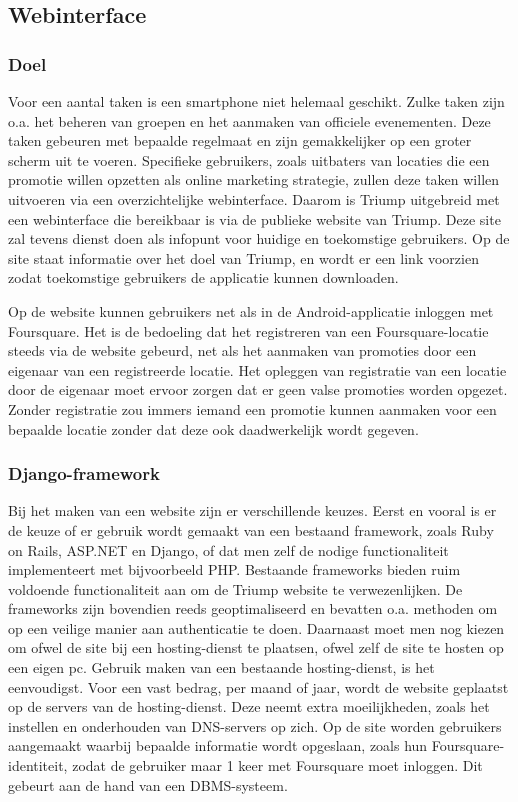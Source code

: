 \subsection{Webinterface}
\label{Webinterface}
\subsubsection{Doel}
Voor een aantal taken is een smartphone niet helemaal geschikt. Zulke taken zijn o.a. het beheren van groepen en het aanmaken van officiele evenementen.
Deze taken gebeuren met bepaalde regelmaat en zijn gemakkelijker op een groter scherm uit te voeren. Specifieke gebruikers, zoals uitbaters van locaties die een promotie willen opzetten als online marketing strategie, zullen deze taken willen uitvoeren via een overzichtelijke webinterface. Daarom is Triump uitgebreid met een webinterface die bereikbaar is via de publieke website van Triump.
Deze site zal tevens dienst doen als infopunt voor huidige en toekomstige gebruikers. Op de site staat informatie over het doel van Triump, en wordt er een link voorzien zodat toekomstige gebruikers de applicatie kunnen downloaden.

Op de website kunnen gebruikers net als in de Android-applicatie inloggen met Foursquare. Het is de bedoeling dat het registreren van een Foursquare-locatie steeds via de website gebeurd, net als het aanmaken van promoties door een eigenaar van een registreerde locatie. Het opleggen van registratie van een locatie door de eigenaar moet ervoor zorgen dat er geen valse promoties worden opgezet. Zonder registratie zou immers iemand een promotie kunnen aanmaken voor een bepaalde locatie zonder dat deze ook daadwerkelijk wordt gegeven.

\subsubsection{Django-framework}
Bij het maken van een website zijn er verschillende keuzes.
Eerst en vooral is er de keuze of er gebruik wordt gemaakt van een bestaand framework, zoals Ruby on Rails, ASP.NET en Django, of dat men zelf de nodige functionaliteit implementeert met bijvoorbeeld PHP.
Bestaande frameworks bieden ruim voldoende functionaliteit aan om de Triump website te verwezenlijken. De frameworks zijn bovendien reeds geoptimaliseerd en bevatten o.a. methoden om op een veilige manier aan authenticatie te doen.
Daarnaast moet men nog kiezen om ofwel de site bij een hosting-dienst te plaatsen, ofwel zelf de site te hosten op een eigen pc. Gebruik maken van een bestaande hosting-dienst, is het eenvoudigst. Voor een vast bedrag, per maand of jaar, wordt de website geplaatst op de servers van de hosting-dienst. Deze neemt extra moeilijkheden, zoals het instellen en onderhouden van DNS-servers op zich.
Op de site worden gebruikers aangemaakt waarbij bepaalde informatie wordt opgeslaan, zoals hun Foursquare-identiteit, zodat de gebruiker maar 1 keer met Foursquare moet inloggen. Dit gebeurt aan de hand van een DBMS-systeem. \\

